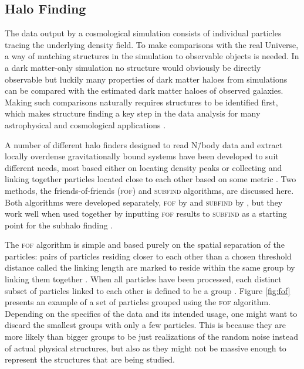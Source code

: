 \documentclass[english, twoside]{HYgradu}
\begin{document}
\subsection{Halo Finding} \label{sect:halofinding}
The data output by a cosmological simulation consists of individual particles tracing the underlying density field. To make comparisons with the real Universe, a way of matching structures in the simulation to observable objects is needed. In a dark matter-only simulation no structure would obviously be directly observable but luckily many properties of dark matter haloes from simulations can be compared with the estimated dark matter haloes of observed galaxies. Making such comparisons naturally requires structures to be identified first, which makes structure finding a key step in the data analysis for many astrophysical and cosmological applications \citep{knebe2013structure}.

A number of different halo finders designed to read N\=/body data and extract locally overdense gravitationally bound systems have been developed to suit different needs, most based either on locating density peaks or collecting and linking together particles located close to each other based on some metric \citep{knebe2013structure}. Two methods, the friends-of-friends (\textsc{fof}) and \textsc{subfind} algorithms, are discussed here. Both algorithms were developed separately, \textsc{fof} by \citet{davis1985evolution} and \textsc{subfind} by \citet{springel2001populating}, but they work well when used together by inputting \textsc{fof} results to \textsc{subfind} as a starting point for the subhalo finding \citep{springel2005cosmological}.

The \textsc{fof} algorithm is simple and based purely on the spatial separation of the particles: pairs of particles residing closer to each other than a chosen threshold distance called the linking length are marked to reside within the same group by linking them together \citep{davis1985evolution}. When all particles have been processed, each distinct subset of particles linked to each other is defined to be a group \citep{davis1985evolution}. Figure \ref{fig:fof} presents an example of a set of particles grouped using the \textsc{fof} algorithm. Depending on the specifics of the data and its intended usage, one might want to discard the smallest groups with only a few particles. This is because they are more likely than bigger groups to be just realizations of the random noise instead of actual physical structures, but also as they might not be massive enough to represent the structures that are being studied.
\end{document}

